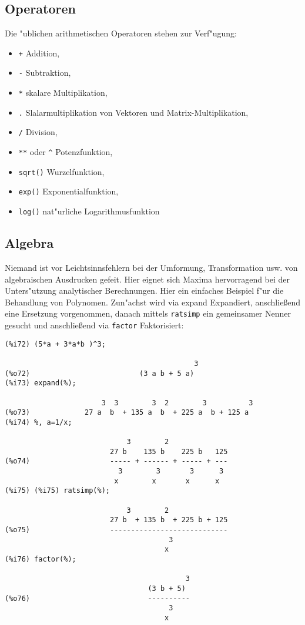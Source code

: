 \documentclass[spanish,12pt,a4paper]{article}
\begin{document}
\subsection{Operatoren}

Die "ublichen arithmetischen Operatoren stehen zur Verf"ugung:

\begin{itemize}
\item \verb|+|  Addition,
\item \verb|-| Subtraktion,
\item \verb|*| skalare Multiplikation,
\item \verb|.| Slalarmultiplikation von Vektoren und Matrix-Multiplikation,
\item \verb|/| Division,
\item \verb|**| oder \verb|^| Potenzfunktion,
\item \verb|sqrt()| Wurzelfunktion,
\item \verb|exp()| Exponentialfunktion,
\item \verb|log()| nat"urliche Logarithmusfunktion
\end{itemize}


\subsection{Algebra}

Niemand ist vor Leichtsinnsfehlern bei der Umformung, Transformation usw. von algebraischen Ausdrucken gefeit. Hier eignet sich Maxima hervorragend bei der Unters"utzung analytischer Berechnungen.
Hier ein einfaches Beispiel f"ur die Behandlung von Polynomen. Zun"achst wird via expand Expandiert, anschlie{\ss}end eine Ersetzung vorgenommen, danach mittels \verb|ratsimp| ein gemeinsamer Nenner gesucht und anschlie{\ss}end via \verb|factor| Faktorisiert:

\scriptsize
\begin{verbatim}
(%i72) (5*a + 3*a*b )^3;

                                             3
(%o72)                          (3 a b + 5 a)
(%i73) expand(%);

                       3  3        3  2        3          3
(%o73)             27 a  b  + 135 a  b  + 225 a  b + 125 a
(%i74) %, a=1/x;

                             3        2
                         27 b    135 b    225 b   125
(%o74)                   ----- + ------ + ----- + ---
                           3        3       3      3
                          x        x       x      x
(%i75) (%i75) ratsimp(%);

                             3        2
                         27 b  + 135 b  + 225 b + 125
(%o75)                   ----------------------------
                                       3
                                      x
(%i76) factor(%);

                                           3
                                  (3 b + 5)
(%o76)                            ----------
                                       3
                                      x
\end{verbatim}
\normalsize
\end{document}
